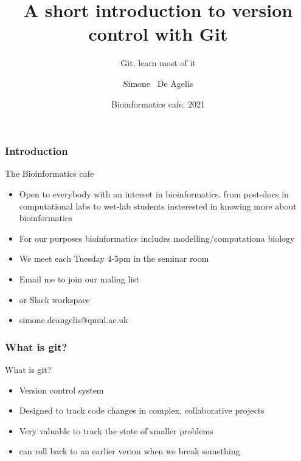 \documentclass{beamer}
\begin{document}
\title[git]
{A short introduction to version control with Git}
\subtitle{Git, learn most of it }
\author[De Angelisll]
{Simone ~De Agelis}
\date[2021]
{Bioinformatics cafe, 2021}
\subject{Computer Science}

\frame{\titlepage}

\begin{frame}
  \frametitle{Introduction}
  
  \begin{block}{The Bioinformatics cafe}
    \begin{itemize}  
      \item Open to everybody with an interset in bioinformatics. from post-docs in computational labs to wet-lab students insterested in knowing more about bioinformatics
      \item For our purposes bioinformatics includes modelling/computationa biology 
      \item We meet each Tuesday 4-5pm in the seminar room
      \item Email me to join our maling list
      \item or Slack workspace
      \item simone.deangelis@qmul.ac.uk 
    \end{itemize}
  \end{block}

\end{frame}


\begin{frame}
  \frametitle{What is git?}

  \begin{block}{What is git?}
    \begin{itemize}  
      \item Version control system 
      \item Designed to track code changes in complex, collaborative projects
      \item Very valuable to track the state of smaller problems 
      \item can roll back to an earlier verion when we break something
    \end{itemize}
  \end{block}
\end{frame}

\end{document}
